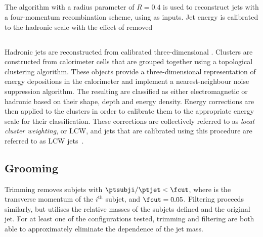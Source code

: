 \subsection{\Antikt}

The \antikt algorithm with a radius parameter of $R=0.4$ is used to reconstruct jets with a four-momentum recombination scheme, using \topos as inputs. Jet energy is calibrated to the hadronic scale with the effect of \pileup removed

\subsection{\Topos}

Hadronic jets are reconstructed from calibrated three-dimensional \topos.
Clusters are constructed from calorimeter cells that are grouped together using a topological clustering algorithm.
These objects provide a three-dimensional representation of energy depositions in the calorimeter and implement a nearest-neighbour noise suppression algorithm.
The resulting \topos are classified as either electromagnetic or hadronic based on their shape, depth and energy density.
Energy corrections are then applied to the clusters in order to calibrate them to the appropriate energy scale for their classification.
These corrections are collectively referred to as \textit{local cluster weighting}, or LCW, and jets that are calibrated using this procedure are referred to as LCW jets~\cite{PERF-2012-01}.

\subsection{Grooming}

Trimming removes subjets with $\ptsubji/\ptjet < \fcut$, where \ptsubji is the transverse momentum of the $i^{\text{th}}$ subjet, and $\fcut=0.05$.
Filtering proceeds similarly, but utilises the relative masses of the subjets defined and the original jet. For at least one of the configurations tested, trimming and filtering are both able to approximately eliminate the \pileup dependence of the jet mass.
